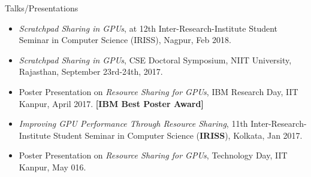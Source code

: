 \documentclass{resume} %
\begin{document}
\begin{comment}
\begin{rSection}{Past Work Experience}
\begin{itemize}

\item \begin{rSubsection}{IBM India Research Laboratory}{\textit{May 2013 - July 2013}}{Research Intern}{New Delhi}
\textit{Project Title}: Reliable Multicast using Software Defined Networking 
\end{rSubsection}



\item \begin{rSubsection}{Oracle India Pvt Ltd}{\textit{June 2009 - July 2011}}{Member of Technical Staff}{Hyderabad}
The aim of our project is to find the security vulnerabilities in a product and provide best possible solutions to make it secure.
\end{rSubsection}


\end{itemize}
\end{rSection}

\end{comment}

\pagebreak

\begin{rSection}{Talks/Presentations}
\begin{itemize}
\item \textit{Scratchpad Sharing in GPUs}, at 12th Inter-Research-Institute Student Seminar in Computer Science (IRISS), Nagpur, Feb 2018. 
\item \textit{Scratchpad Sharing in GPUs}, CSE Doctoral Symposium, NIIT University, Rajasthan, September 23rd-24th, 2017.
\item Poster Presentation on \textit{Resource Sharing for GPUs}, IBM Research Day, IIT Kanpur, April 2017. \textbf{[IBM Best Poster Award]} 
\item \textit{Improving GPU Performance Through Resource Sharing}, 11th Inter-Research-Institute Student Seminar in Computer Science (\textbf{IRISS}), Kolkata, Jan 2017.
\item Poster Presentation on \textit{Resource Sharing for GPUs}, Technology Day, IIT Kanpur, May 016. 

\end{itemize}
\end{rSection}
\end{document}

